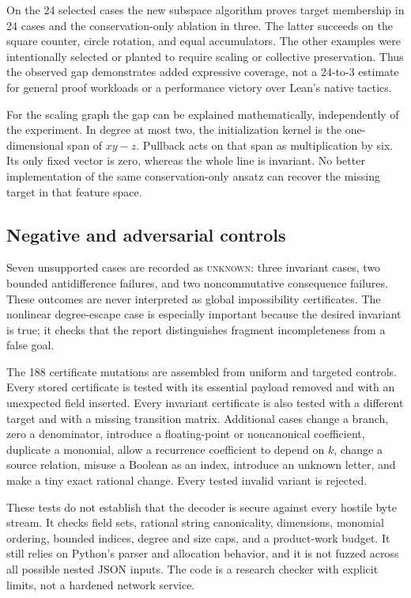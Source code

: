 \documentclass[11pt,letterpaper]{article}
\newcommand{\unknown}{\textsc{unknown}}
\theoremstyle{definition}\newtheorem{definition}[theorem]{Definition}
\theoremstyle{remark}\newtheorem{remark}[theorem]{Remark}
\begin{document}
On the 24 selected cases the new subspace algorithm proves target membership in
24 cases and the conservation-only ablation in three. The latter succeeds on
the square counter, circle rotation, and equal accumulators. The other examples
were intentionally selected or planted to require scaling or collective
preservation. Thus the observed gap demonstrates added expressive coverage,
not a 24-to-3 estimate for general proof workloads or a performance victory over
Lean's native tactics.

For the scaling graph the gap can be explained mathematically, independently
of the experiment. In degree at most two, the initialization kernel is the
one-dimensional span of $xy-z$. Pullback acts on that span as multiplication
by six. Its only fixed vector is zero, whereas the whole line is invariant.
No better implementation of the same conservation-only ansatz can recover the
missing target in that feature space.

\subsection{Negative and adversarial controls}
Seven unsupported cases are recorded as \unknown{}: three invariant cases,
two bounded antidifference failures, and two noncommutative consequence
failures. These outcomes are never interpreted as global impossibility
certificates. The nonlinear degree-escape case is especially important because
the desired invariant is true; it checks that the report distinguishes
fragment incompleteness from a false goal.

The 188 certificate mutations are assembled from uniform and targeted
controls. Every stored certificate is tested with its essential payload
removed and with an unexpected field inserted. Every invariant certificate is
also tested with a different target and with a missing transition matrix.
Additional cases change a branch, zero a denominator, introduce a floating-point
or noncanonical coefficient, duplicate a monomial, allow a recurrence
coefficient to depend on $k$, change a source relation, misuse a Boolean as an
index, introduce an unknown letter, and make a tiny exact rational change.
Every tested invalid variant is rejected.

These tests do not establish that the decoder is secure against every hostile
byte stream. It checks field sets, rational string canonicality, dimensions,
monomial ordering, bounded indices, degree and size caps, and a product-work
budget. It still relies on Python's parser and allocation behavior, and it is
not fuzzed across all possible nested JSON inputs. The code is a research
checker with explicit limits, not a hardened network service.
\end{document}
